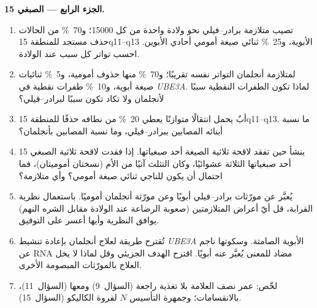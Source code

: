\begin{problem}
\medskip
\noindent\textbf{الجزء الرابع --- الصبغي 15.}
\begin{enumerate}[resume]
  \item تصيب متلازمة برادر--فيلي نحو ولادة واحدة من كل \num{15000}؛
        و\qty{70}{\%} من الحالات حذف مستجد للمنطقة 15q11--q13
        الأبوية، و\qty{25}{\%} ثنائي صيغة أمومي أحادي الأبوين. احسب
        تواتر كل سبب عند الولادة.
  \item لمتلازمة أنجلمان التواتر نفسه تقريبًا؛ و\qty{70}{\%} منها
        حذوف أمومية، و\qty{5}{\%} ثنائيات صيغة أبوية، و\qty{10}{\%}
        طفرات نقطية في \emph{UBE3A}. لماذا تكون الطفرات النقطية سببًا
        لأنجلمان ولا تكاد تكون سببًا لبرادر--فيلي؟
  \item أبٌ يحمل انتقالًا متوازنًا يعطي \qty{20}{\%} من نطافه حذفًا
        للمنطقة 15q11--q13. ما نسبة أبنائه المصابين ببرادر--فيلي، وما
        نسبة المصابين بأنجلمان؟
  \item ينشأ  حين تفقد لاقحة ثلاثية الصيغة
        أحد صبغياتها. إذا فقدت لاقحة ثلاثية الصبغي 15 أحد صبغياتها
        الثلاثة عشوائيًا، وكان التثلث آتيًا من الأم (نسختان
        أموميتان)، فما احتمال أن يكون للناجي ثنائي صيغة أمومي؟ وأي
        متلازمة؟
  \item يُعبَّر عن مورّثات برادر--فيلي أبويًا وعن مورّثة أنجلمان
        أموميًا. باستعمال نظرية القرابة، قل أيّ أعراض المتلازمتين
        (صعوبة الرضاعة عند الولادة مقابل الشره النهم) يوافق النظرية
        وأيها أعسر على التوفيق.
  \item تُقترح طريقة لعلاج أنجلمان بإعادة تنشيط \emph{UBE3A}
        الأبوية الصامتة. وسكوتها ناجم عن RNA مضاد للمعنى يُعبَّر عنه
        أبويًا. اقترح الهدف الجزيئي وقل لماذا لا يخل العلاج
        بالمورّثات المبصومة الأخرى.
  \item لخّص: عمر نصف العلامة بلا تغذية راجعة (السؤال~9) ومعها
        (السؤال~11)، بالانقسامات؛ وجمهرة التأسيس $N$ لفروة الكاليكو
        (السؤال~15).
\end{enumerate}
\end{problem}
